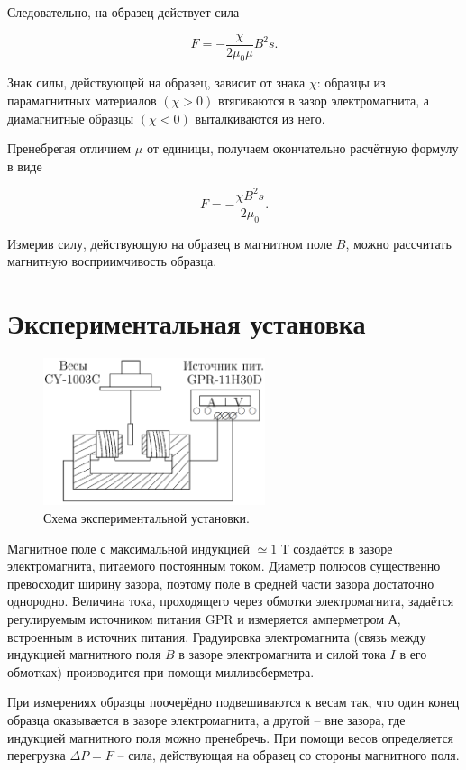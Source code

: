 \documentclass[a4paper,12pt]{article} %
\begin{document}
Следовательно, на образец действует сила

\begin{equation}\label{4}
F = -\frac{\chi}{2\mu_0\mu}B^2s.
\end{equation}

Знак силы, действующей на образец, зависит от знака $ \chi $: образцы из парамагнитных материалов $( \chi  > 0)$ втягиваются в зазор электромагнита, а диамагнитные образцы $ (\chi < 0) $ выталкиваются из него.

Пренебрегая отличием $ \mu $ от единицы, получаем окончательно расчётную формулу в виде

\begin{equation}\label{5}
F = -\frac{\chi B^2s}{2\mu_0}.
\end{equation}

Измерив силу, действующую на образец в магнитном поле $ B $, можно рассчитать магнитную восприимчивость образца.

\section{Экспериментальная установка}

\begin{figure}
	\includegraphics[width=6.5cm]{Screenshot_1.png}
	\caption{Схема экспериментальной установки.}
	\label{pic:1}
\end{figure}


Магнитное поле с максимальной индукцией $ \simeq 1 $ Т создаётся в зазоре электромагнита, питаемого постоянным током. Диаметр полюсов существенно превосходит ширину зазора, поэтому поле в средней части зазора достаточно однородно. Величина тока, проходящего через обмотки электромагнита, задаётся регулируемым источником питания GPR и измеряется амперметром $ А $, встроенным в источник питания. Градуировка электромагнита (связь между индукцией магнитного поля $ B $ в зазоре электромагнита и силой тока $ I $ в его обмотках) производится при помощи милливеберметра.


При измерениях образцы поочерёдно подвешиваются к весам так, что один конец образца оказывается в зазоре электромагнита, а другой -- вне зазора, где индукцией магнитного поля можно пренебречь. При помощи весов определяется перегрузка $ \Delta P = F $ -- сила, действующая на образец со стороны магнитного поля.
\end{document}
